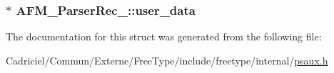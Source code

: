 \hypertarget{struct_a_f_m___parser_rec___a9fa78a781737bf27e00448c5092b7657}{
\subsubsection[{user\-\_\-data}]{$\ast$ A\-F\-M\-\_\-\-Parser\-Rec\-\_\-\-::user\-\_\-data}}\label{struct_a_f_m___parser_rec___a9fa78a781737bf27e00448c5092b7657}


The documentation for this struct was generated from the following file\-:\begin{DoxyCompactItemize}
\item 
Cadriciel/\-Commun/\-Externe/\-Free\-Type/include/freetype/internal/\hyperlink{psaux_8h}{psaux.\-h}\end{DoxyCompactItemize}
